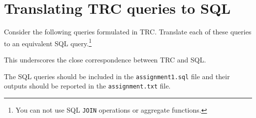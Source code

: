 \documentclass{article}
\begin{document}
\begin{enumerate}[resume]
\newpage

\end{enumerate}

\section{Translating TRC queries to SQL}

Consider the following queries formulated in TRC.   Translate each of these queries to an equivalent SQL query.\footnote{
You can not use SQL {\tt JOIN} operations or
aggregate functions.}

This underscores the close correspondence between TRC and SQL.

The SQL queries should be included in the {\tt assignment1.sql} file and their outputs should be reported in the
{\tt assignment.txt} file.
\end{document}
